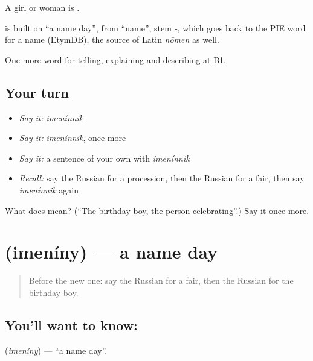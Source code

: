 A girl or woman is \emph{}.

\begin{cousinweb}
\emph{} is built on \emph{} \textquotedblleft{}a name day\textquotedblright{}, from \emph{} \textquotedblleft{}name\textquotedblright{}, stem \emph{-}, which goes back to the PIE word for a name (EtymDB), the source of Latin \emph{nōmen} as well.
\end{cousinweb}

\begin{grammarlens}[title={What you've built}]
One more word for telling, explaining and describing at B1.
\end{grammarlens}

\subsection*{Your turn}
\begin{itemize}
\raggedright
  \item \emph{Say it:} \emph{imenínnik}
  \item \emph{Say it:} \emph{imenínnik}, once more
  \item \emph{Say it:} a sentence of your own with \emph{imenínnik}
  \item \emph{Recall:} say the Russian for a procession, then the Russian for a fair, then say \emph{imenínnik} again
\end{itemize}

\begin{tcolorbox}[breakable,colback=teal!4,colframe=teal!35!black,title={Before you move on}]
What does  mean? (\textquotedblleft{}The birthday boy, the person celebrating\textquotedblright{}.) Say it once more.
\end{tcolorbox}
\section[\texorpdfstring{\ru{именины} (imeníny)}{именины (imeníny)}]{ (imeníny) — a name day}

\label{lesson:RU-C317-imeniny}



\begin{quote}
Before the new one: say the Russian for a fair, then the Russian for the birthday boy.
\end{quote}

\subsection*{You'll want to know: }
\textbf{} (\emph{imeníny}) — \textquotedblleft{}a name day\textquotedblright{}.

